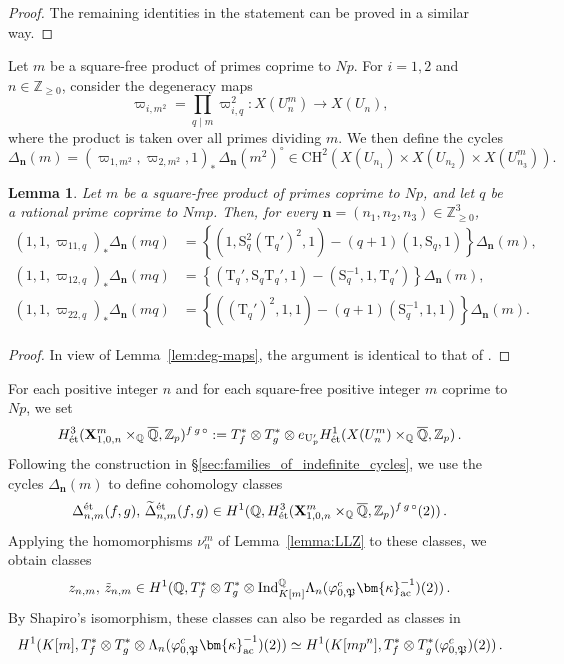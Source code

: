 \documentclass{amsart}
\numberwithin{equation}{section}
\newtheorem{lemma}[theorem]{Lemma}
\newcommand{\bb}{\mathbb}
\newcommand{\frk}{\mathfrak}
\newcommand{\QQ}{\mathbb{Q}}
\newcommand{\ZZ}{\mathbb{Z}}
\newcommand{\Ind}{\mathrm{Ind}}
\newcommand{\ac}{\textup{ac}}
\newcommand{\etale}{\textup{\'et}}
\begin{document}
\begin{proof}
     
     The remaining identities in the statement can be proved in a similar way.
\end{proof}


Let $m$ be a square-free product of primes coprime to $Np$. For $i=1,2$ and $n\in \mathbb{Z}_{\geq 0}$, consider the degeneracy maps
\[
\varpi_{i,m^2}=\prod_{q\mid m} \varpi_{i,q}^2 : X(U_n^m)\rightarrow X(U_n), 
\]
where the product is taken over all primes dividing $m$. We then define the cycles
\[
\Delta_{\mathbf{n}}(m)=(\varpi_{1,m^2},\varpi_{2,m^2},1)_\ast\,\Delta_{\mathbf{n}}(m^2)^\circ\in\mathrm{CH}^2(X(U_{n_1})\times X(U_{n_2})\times X(U_{n_3}^m)).
\]

\begin{lemma}\label{lemma:norm-relations}
Let $m$ be a square-free product of primes coprime to $Np$, and let $q$ be a rational prime coprime to $Nmp$. Then, for every $\mathbf{n}=(n_1,n_2,n_3) \in \mathbb{Z}_{\geq 0}^3$,
\begin{align*}
(1,1,\varpi_{11,q})_\ast \Delta_{\mathbf{n}}(mq)&=\left\{(1,\mathrm{S}_q^2 (\mathrm{T}_{q}')^2,1)-(q+1)(1,\mathrm{S}_q,1)\right\}\Delta_{\mathbf{n}}(m),\\
(1,1,\varpi_{12,q})_\ast \Delta_{\mathbf{n}}(mq)&=\left\{(\mathrm{T}_q',\mathrm{S}_q\mathrm{T}_{q}',1)-(\mathrm{S}_q^{-1},1,\mathrm{T}_q')\right\}\Delta_{\mathbf{n}}(m),\\
(1,1,\varpi_{22,q})_\ast \Delta_{\mathbf{n}}(mq)&=\left\{((\mathrm{T}_q')^2,1,1)-(q+1)(\mathrm{S}_q^{-1},1,1)\right\}\Delta_{\mathbf{n}}(m).
\end{align*}
\end{lemma}
\begin{proof}
In view of Lemma~\ref{lem:deg-maps}, the argument is identical to that of \cite[Lem.~4.4]{ACR}.
\end{proof}


For each positive integer $n$ and for each square-free positive integer $m$ coprime to $Np$, we set
$$H^3_{\etale}(\mathbf{X}_{1,0,n}^m\times_{\QQ}
\overline{\QQ},\ZZ_p)^{f \,g\, \circ} := T_f^*\otimes T_g^* \otimes e_{\mathrm{U}_{p}'} H^1_{\etale} (X(U_{n}^m)\times_{\QQ}
\overline{\QQ}, \ZZ_p)\,.$$
Following the construction in \S\ref{sec:families_of_indefinite_cycles}, we use the cycles $\Delta_{\mathbf{n}}(m)$ to define cohomology classes
\[
\Delta_{n,m}^{\etale}(f,g),\,\widetilde{\Delta}_{n,m}^{\etale}(f,g) \in H^1(\bb{Q},H^3_{\etale}(\mathbf{X}_{1,0,n}^m\times_{\QQ}
\overline{\QQ},\ZZ_p)^{f \,g\, \circ}(2))\,.
\]
Applying the homomorphisms $\nu_n^m$ of Lemma~\ref{lemma:LLZ} to these classes, we obtain classes
\[
z_{n,m},\,\tilde{z}_{n,m}\in H^1(\bb{Q},T_f^*\otimes T_g^*\otimes \Ind_{K[m]}^{\bb{Q}}\Lambda_n(\varphi_{0,\frk{P}}^c\bm{\kappa}_{\ac}^{-1})(2))\,.
\]
By Shapiro's isomorphism, these classes can also be regarded as classes in
\[
H^1(K[m],T_f^\ast\otimes T_g^\ast\otimes \Lambda_n(\varphi_{0,\frk{P}}^c\bm{\kappa}_{\ac}^{-1})(2))
\simeq H^1(K[mp^n],T_f^\ast\otimes T_g^\ast(\varphi_{0,\frk{P}}^c)(2))\,.
\]
\end{document}
